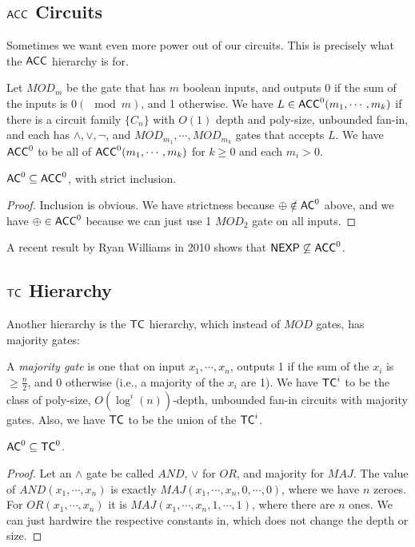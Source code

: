 \subsection{${\mathsf{ACC}}$ Circuits}
Sometimes we want even more power out of our circuits. This is precisely what the ${\mathsf{ACC}}$ hierarchy is for.
\begin{definition}
Let $MOD_m$ be the gate that has $m$ boolean inputs, and outputs 0 if the sum of the inputs is $0 (\mod m)$, and 1 otherwise. We have $L \in {\ensuremath{\mathsf{ACC}}}^0(m_1, \cdots, m_k)$ if there is a circuit family $\{C_n\}$ with $O(1)$ depth and poly-size, unbounded fan-in, and each has $\wedge, \vee, \neg$, and $MOD_{m_1}, \cdots, MOD_{m_k}$ gates that accepts $L$. We have ${\mathsf{ACC}}^0$ to be all of ${\mathsf{ACC}}^0(m_1, \cdots, m_k)$ for $k \ge 0$ and each $m_i > 0$. 
\end{definition}

\begin{theorem}
${\mathsf{AC}}^0 \subseteq {\ensuremath{\mathsf{ACC}}}^0$, with strict inclusion.
\end{theorem}

\begin{proof}
Inclusion is obvious. We have strictness because $\oplus \notin {\ensuremath{\mathsf{AC}}}^0$ above, and we have $\oplus \in {\ensuremath{\mathsf{ACC}}}^0$ because we can just use 1 $MOD_2$ gate on all inputs.
\end{proof}

A recent result by Ryan Williams in 2010 shows that ${\mathsf{NEXP}} \not\subseteq {\ensuremath{\mathsf{ACC}}}^0$. 

\subsection{${\mathsf{TC}}$ Hierarchy}
Another hierarchy is the ${\mathsf{TC}}$ hierarchy, which instead of $MOD$ gates, has majority gates:
\begin{definition}
A \emph{majority gate} is one that on input $x_1, \cdots, x_n$, outputs 1 if the sum of the $x_i$ is $\ge \frac{n}{2}$, and 0 otherwise (i.e., a majority of the $x_i$ are 1). We have ${\mathsf{TC}}^i$ to be the class of poly-size, $O(\log^i(n))$-depth, unbounded fan-in circuits with majority gates. Also, we have ${\mathsf{TC}}$ to be the union of the ${\mathsf{TC}}^i$.
\end{definition}

\begin{theorem}
${\mathsf{AC}}^0 \subseteq {\ensuremath{\mathsf{TC}}}^0$.
\end{theorem}
\begin{proof}
Let an $\wedge$ gate be called $AND$, $\vee$ for $OR$, and majority for $MAJ$. The value of $AND(x_1, \cdots, x_n)$ is exactly $MAJ(x_1, \cdots, x_n, 0, \cdots, 0)$, where we have $n$ zeroes. For $OR(x_1, \cdots, x_n)$ it is $MAJ(x_1, \cdots, x_n, 1, \cdots, 1)$, where there are $n$ ones. We can just hardwire the respective constants in, which does not change the depth or size. 
\end{proof}

